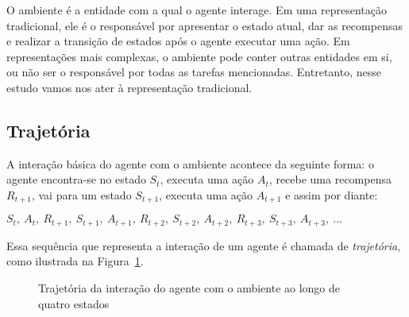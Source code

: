 \documentclass{article}
\begin{document}
                O ambiente é a entidade com a qual o agente interage. Em uma representação tradicional, ele é o responsável por apresentar o estado atual, dar as recompensas e realizar a transição de estados após o agente executar uma ação. Em representações mais complexas, o ambiente pode conter outras entidades em si, ou não ser o responsável por todas as tarefas mencionadas. Entretanto, nesse estudo vamos nos ater à representação tradicional.
            
        \subsection{Trajetória}
        
            A interação básica do agente com o ambiente acontece da seguinte forma: o agente encontra-se no estado $S_t$, executa uma ação $A_t$, recebe uma recompensa $R_{t+1}$, vai para um estado $S_{t+1}$, executa uma ação $A_{t+1}$ e assim por diante:

            $S_t,\ A_t,\ R_{t+1},\ S_{t+1},\ A_{t+1},\ R_{t+2},\ S_{t+2},\ A_{t+2},\ R_{t+3},\ S_{t+3},\ A_{t+3},\ \dots$
            
            Essa sequência que representa a interação de um agente é chamada de \emph{trajetória}, como ilustrada na Figura~\ref{fig:trajectory}.

            \begin{figure}[ht]
                \centering
                \caption{Trajetória da interação do agente com o ambiente ao longo de quatro estados}
                \label{fig:trajectory}
            \end{figure}
                
\end{document}
